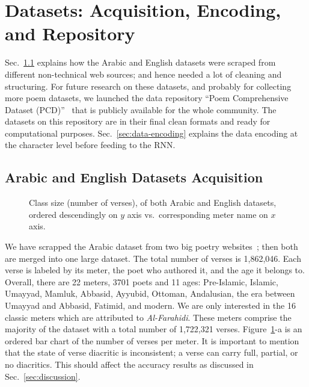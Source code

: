 \section{Datasets: Acquisition, Encoding, and Repository}\label{sec:datasets}
Sec.~\ref{sec:arabic_english_dataset} explains how the Arabic and English datasets were scraped from
different non-technical web sources; and hence needed a lot of cleaning and structuring. For future research on
these datasets, and probably for collecting more poem datasets, we launched the data repository
``Poem Comprehensive Dataset (PCD)''~\citep{Yousef2018PoemComprehensiveDataset} that is publicly
available for the whole community. The datasets on this repository are in their final clean formats
and ready for computational purposes. Sec.~\ref{sec:data-encoding} explains the data encoding at the
character level before feeding to the RNN\@.

\subsection{Arabic and English Datasets Acquisition}\label{sec:arabic_english_dataset}
\begin{figure}[!tb]
  \centering
  \begin{tikzpicture}[scale=0.8]
    
    
  \end{tikzpicture}%
  \caption{\footnotesize Class size (number of verses), of both Arabic and English datasets, ordered
    descendingly on $y$ axis vs.\ corresponding meter name on $x$
    axis.}\label{fig:footn-footn-class}
\end{figure}
We have scrapped the Arabic dataset from two big poetry websites~\citep{diwan,
  PoetryEncyclopedia2016}; then both are merged into one large dataset. The total number of verses
is 1,862,046. Each verse is labeled by its meter, the poet who authored it, and the age it belongs
to. Overall, there are 22 meters, 3701 poets and 11 ages: Pre-Islamic, Islamic, Umayyad, Mamluk,
Abbasid, Ayyubid, Ottoman, Andalusian, the era between Umayyad and Abbasid, Fatimid, and modern. We are
only interested in the 16 classic meters which are attributed to \textit{Al-Farahidi}. These meters
comprise the majority of the dataset with a total number of 1,722,321
verses. Figure~\ref{fig:footn-footn-class}-a is an ordered bar chart of the number of verses per
meter. It is important to mention that the state of verse diacritic is inconsistent; a verse can
carry full, partial, or no diacritics. This should affect the accuracy results as discussed in
Sec.~\ref{sec:discussion}.

